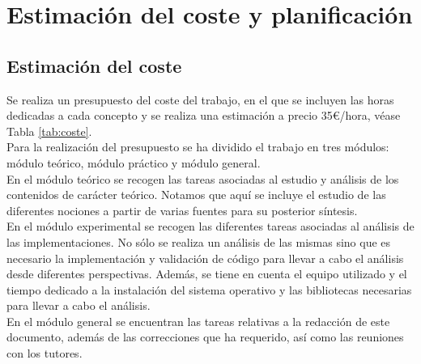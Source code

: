 \documentclass[12pt,a4paper]{report} %
\theoremstyle{definition}
\begin{document}
\chapter{Estimación del coste y planificación}

\section{Estimación del coste}

Se realiza un presupuesto del coste del trabajo, en el que se incluyen las horas dedicadas a cada concepto y se realiza una estimación a precio 35€/hora, véase Tabla \ref{tab:coste}.\\

Para la realización del presupuesto se ha dividido el trabajo en tres módulos: módulo teórico, módulo práctico y módulo general.\\

En el módulo teórico se recogen las tareas asociadas al estudio y análisis de los contenidos de carácter teórico. Notamos que aquí se incluye el estudio de las diferentes nociones a partir de varias fuentes para su posterior síntesis.\\

En el módulo experimental se recogen las diferentes tareas asociadas al análisis de las implementaciones. No sólo se realiza un análisis de las mismas sino que es necesario la implementación y validación de código para llevar a cabo el análisis desde diferentes perspectivas. Además, se tiene en cuenta el equipo utilizado y el tiempo dedicado a la instalación del sistema operativo y las bibliotecas necesarias para llevar a cabo el análisis.\\

En el módulo general se encuentran las tareas relativas a la redacción de este documento, además de las correcciones que ha requerido, así como las reuniones con los tutores.\\
\end{document}
